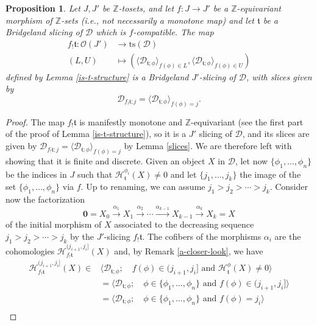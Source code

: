\documentclass{article}
\newtheorem{prop}[thm]{Proposition}
\theoremstyle{definition}
\newcommand{\Z}{\mathbb{Z}}
\newcommand{\Oo}{\mathcal{O}}
\newcommand{\ts}{\mathrm{ts}}
\newcommand{\tee}{\mathfrak{t}}
\begin{document}
\begin{prop}
Let $J,J'$ be $\Z$-tosets, and let  $f\colon J\to J'$ be a $\Z$-equivariant morphism of $\Z$-sets (i.e., not necessarily a monotone map) and let $\tee$ be a Bridgeland slicing of $\mathscr{D}$ which is $f$-compatible.  The map
\begin{align*}
f_!\tee\colon \Oo(J')&\to\ts(\mathscr{D})\\
(L,U)&\mapsto (\langle \mathscr{D}_{\tee;\phi}\rangle_{f(\phi)\in L},\langle \mathscr{D}_{\tee;\phi}\rangle_{f(\phi)\in U})
\end{align*}
defined by Lemma \ref{is-t-structure} is a Bridgeland $J'$-slicing of $\mathscr{D}$, with slices given by
\[
\mathscr{D}_{f_!\tee;j}=\langle \mathscr{D}_{\tee;\phi}\rangle_{f(\phi)=j}.
\]
\end{prop}
\begin{proof}
The map $f_!\tee$ is manifestly monotone and $\Z$-equivariant (see the first part of the proof of Lemma \ref{is-t-structure}), so it is a $J'$ slicing of $\mathscr{D}$, and its slices are given by $\mathscr{D}_{f_!\tee;j}=
\langle \mathscr{D}_{\tee;\phi}\rangle_{f(\phi)=j}$ by Lemma \ref{slices}. We are therefore left with showing that it is finite and discrete. Given an object $X$ in $\mathscr{D}$, let now $\{\phi_1,\dots,\phi_n\}$ be the indices in $J$ such that $\mathcal{H}^{\phi_i}_\tee(X)\neq 0$ and let $\{j_1,\dots,j_k\}$ the image of the set $\{\phi_1,\dots,\phi_n\}$ via $f$. Up to renaming, we can assume $j_1>j_{2}>\cdots>j_k$. Consider now the factorization
\[
\mathbf{0}=X_0 \xrightarrow{\alpha_1} X_1\xrightarrow{\alpha_2}\cdots \xrightarrow{\alpha_{k-1}}X_{k-1}\xrightarrow{\alpha_k} X_k=X
\]
of the initial morphism of $X$ associated to the decreasing sequence $j_1>j_2>\cdots>j_k$ by the $J'$-slicing $f_!\tee$. The cofibers of the morphisms $\alpha_{i}$ are the cohomologies
$\mathcal{H}^{(j_{i+1},j_{i}]}_{f_!\tee}(X)$ and, by Remark \ref{a-closer-look}, we have
\begin{align*}
\mathcal{H}^{(j_{i+1},j_{i}]}_{f_!\tee}(X)\in& \langle \mathscr{D}_{\tee;\phi};\quad f(\phi)\in (j_{i+1},j_{i}] \text{ and }\mathcal{H}^\phi_\tee(X)\neq 0\rangle\\
&=\langle \mathscr{D}_{\tee;\phi};\quad \phi\in\{\phi_1,\dots,\phi_n\}\text{ and } f(\phi)\in(j_{i+1},j_{i}]\rangle\\
&=\langle \mathscr{D}_{\tee;\phi};\quad \phi\in\{\phi_1,\dots,\phi_n\}\text{ and } f(\phi)=j_{i}\rangle\\

\end{align*}
\end{proof}
\end{document}
